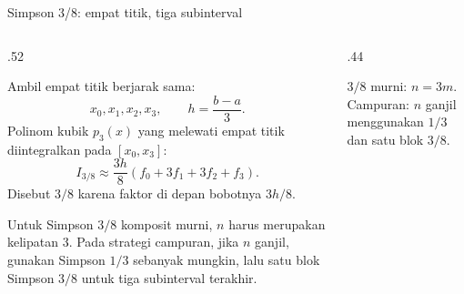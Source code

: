 \documentclass[aspectratio=169,10pt]{beamer}
\begin{document}
\begin{frame}{Simpson 3/8: empat titik, tiga subinterval}
\scriptsize
\begin{columns}[T,totalwidth=\textwidth]
\begin{column}{.52\textwidth}
\begin{purplebox}
Ambil empat titik berjarak sama:
\[
x_0,x_1,x_2,x_3,
\qquad h=\frac{b-a}{3}.
\]
Polinom kubik $p_3(x)$ yang melewati empat titik diintegralkan pada $[x_0,x_3]$:
\[
\boxed{I_{3/8}\approx\frac{3h}{8}(f_0+3f_1+3f_2+f_3)}.
\]
Disebut $3/8$ karena faktor di depan bobotnya $3h/8$.
\end{purplebox}
\begin{goldbox}
Untuk Simpson $3/8$ komposit murni, $n$ harus merupakan kelipatan 3.
Pada strategi campuran, jika $n$ ganjil, gunakan Simpson $1/3$ sebanyak mungkin, lalu satu blok Simpson $3/8$ untuk tiga subinterval terakhir.
\end{goldbox}
\end{column}
\begin{column}{.44\textwidth}
\begin{greenbox}[Syarat]
$3/8$ murni: $n=3m$.\quad
Campuran: $n$ ganjil menggunakan $1/3$ dan satu blok $3/8$.
\end{greenbox}
\end{column}
\end{columns}
\end{frame}
\end{document}

